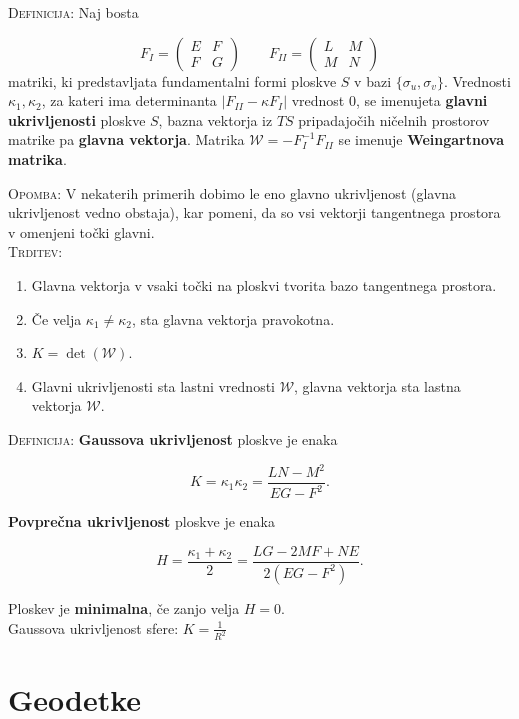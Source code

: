 \documentclass[8pt,a4paper]{amsart}
\theoremstyle{definition} %
\theoremstyle{plain} %
\begin{document}
\textsc{Definicija: }Naj bosta

$$
F_I=\left( \begin{array}{cc} E & F \\ F & G \end{array} \right)
\qquad
F_{II}=\left( \begin{array}{cc} L & M \\ M & N \end{array} \right)
$$
matriki, ki predstavljata fundamentalni formi ploskve $S$ v bazi $\{ \sigma_u,\sigma_v\}$. Vrednosti $\kappa_1,\kappa_2$, za kateri ima determinanta $|F_{II}-\kappa F_I|$ vrednost $0$, se imenujeta \textbf{glavni ukrivljenosti} ploskve $S$, bazna vektorja iz $TS$ pripadajočih ničelnih prostorov matrike pa \textbf{glavna vektorja}. Matrika $\mathcal{W}=-F_I^{-1}F_{II}$ se imenuje \textbf{Weingartnova matrika}.

\textsc{Opomba:} V nekaterih primerih dobimo le eno glavno ukrivljenost (glavna ukrivljenost vedno obstaja), kar pomeni, da so vsi vektorji tangentnega prostora v omenjeni točki glavni.
\\

\textsc{Trditev:}
\begin{enumerate}
\item Glavna vektorja v vsaki točki na ploskvi tvorita bazo tangentnega prostora.
\item Če velja $\kappa_1 \neq \kappa_2$, sta glavna vektorja pravokotna.
\item $K = \det(\mathcal{W})$.
\item Glavni ukrivljenosti sta lastni vrednosti $\mathcal{W}$, glavna vektorja sta lastna vektorja $\mathcal{W}$.
\end{enumerate}

\textsc{Definicija:} \textbf{Gaussova ukrivljenost} ploskve je enaka

$$
K = \kappa_1\kappa_2 = \frac{LN-M^2}{EG-F^2}.
$$

\textbf{Povprečna ukrivljenost} ploskve je enaka

$$
H = \frac{\kappa_1+\kappa_2}{2} = \frac{LG-2MF+NE}{2(EG-F^2)}.
$$

Ploskev je \textbf{minimalna}, če zanjo velja $H=0$.
\\

Gaussova ukrivljenost sfere: $K = \frac{1}{R^2}$

\section*{\textbf{Geodetke}} %
\end{document}
